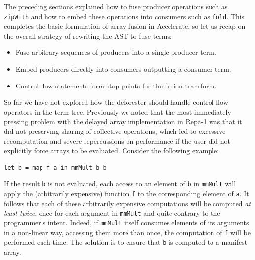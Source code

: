 The preceding sections explained how to fuse producer operations such as
\texttt{zipWith} and how to embed these operations into consumers such as
\texttt{fold}. This completes the basic formulation of array fusion in
Accelerate, so let us recap on the overall strategy of rewriting the AST to fuse
terms:
%
\begin{itemize}
    \item Fuse arbitrary sequences of producers into a single producer term.
    \item Embed producers directly into consumers outputting a consumer term.
    \item Control flow statements form stop points for the fusion transform.
\end{itemize}
%
So far we have not explored how the deforester should handle control flow
operators in the term tree. Previously we noted that the most immediately
pressing problem with the delayed array implementation in Repa-1 was that it did
not preserving sharing of collective operations, which led to excessive
recomputation and severe repercussions on performance if the user did not
explicitly force arrays to be evaluated. Consider the following example:
%
\begin{lstlisting}[style=haskell,numbers=none]
let b = map f a in mmMult b b
\end{lstlisting}
%
If the result \texttt{b} is not evaluated, each access to an element of
\texttt{b} in \texttt{mmMult} will apply the (arbitrarily expensive) function
\texttt{f} to the corresponding element of \texttt{a}. It follows that each of
these arbitrarily expensive computations will be computed \emph{at least twice},
once for each argument in \texttt{mmMult} and quite contrary to the programmer's
intent. Indeed, if \texttt{mmMult} itself consumes elements of its arguments in
a non-linear way, accessing them more than once, the computation of \texttt{f}
will be performed each time. The solution is to ensure that \texttt{b} is
computed to a manifest array.

